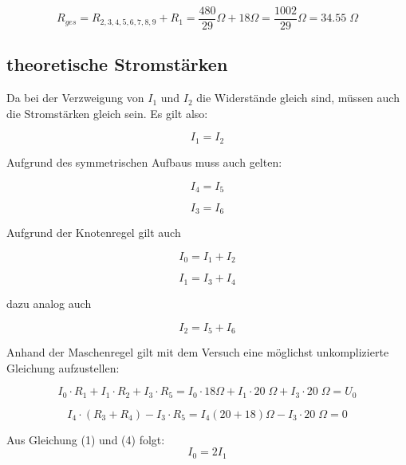 \documentclass[a4paper,12pt]{article}
\begin{document}
$$R_{ges} = R_{2,3,4,5,6,7,8,9} + R_1 = \frac{480}{29}\Omega + 18\Omega = \frac{1002}{29}\Omega = 34.55 \;\Omega$$

\newpage

\subsection{theoretische Stromstärken}

Da bei der Verzweigung von $I_1$ und $I_2$ die Widerstände gleich sind, müssen auch die Stromstärken gleich sein. Es gilt also:

\begin{equation}
I_1 = I_2
\end{equation}

Aufgrund des symmetrischen Aufbaus muss auch gelten:

\begin{equation}
I_4=I_5
\end{equation}

\begin{equation}
I_3=I_6
\end{equation}

Aufgrund der Knotenregel gilt auch

\begin{equation}
I_0 = I_1 + I_2
\end{equation}

\begin{equation}
I_1 = I_3 + I_4
\end{equation}

dazu analog auch

\begin{equation}
I_2 = I_5 + I_6
\end{equation}

Anhand der Maschenregel gilt mit dem Versuch eine möglichst unkomplizierte Gleichung aufzustellen:

\begin{equation}
I_0 \cdot R_1 + I_1 \cdot R_2 + I_3 \cdot R_5 = I_0 \cdot 18 \Omega + I_1 \cdot 20\; \Omega + I_3 \cdot 20\;\Omega = U_0
\end{equation}

\begin{equation}
I_4 \cdot (R_3 + R_4) - I_3 \cdot R_5 = I_4 \left(20+18\right)\Omega - I_3 \cdot 20\;\Omega = 0
\end{equation}

Aus Gleichung (1) und (4) folgt:
\begin{equation}
I_0 = 2I_1
\end{equation}
\end{document}
